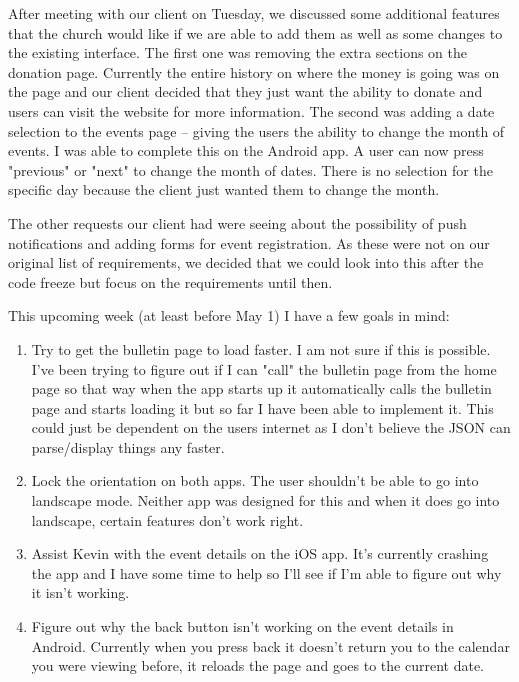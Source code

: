 After meeting with our client on Tuesday, we discussed some additional features that the church would like if we are able to add them as well as some changes to the existing interface. The first one was removing the extra sections on the donation page. Currently the entire history on where the money is going was on the page and our client decided that they just want the ability to donate and users can visit the website for more information. The second was adding a date selection to the events page -- giving the users the ability to change the month of events. I was able to complete this on the Android app. A user can now press "previous" or "next" to change the month of dates. There is no selection for the specific day because the client just wanted them to change the month.

The other requests our client had were seeing about the possibility of push notifications and adding forms for event registration. As these were not on our original list of requirements, we decided that we could look into this after the code freeze but focus on the requirements until then.

This upcoming week (at least before May 1) I have a few goals in mind:

	\begin{enumerate}
\item Try to get the bulletin page to load faster. I am not sure if this is possible. I've been trying to figure out if I can "call" the bulletin page from the home page so that way when the app starts up it automatically calls the bulletin page and starts loading it but so far I have been able to implement it. This could just be dependent on the users internet as I don't believe the JSON can parse/display things any faster.
\item Lock the orientation on both apps. The user shouldn't be able to go into landscape mode. Neither app was designed for this and when it does go into landscape, certain features don't work right.
\item Assist Kevin with the event details on the iOS app. It's currently crashing the app and I have some time to help so I'll see if I'm able to figure out why it isn't working.
\item Figure out why the back button isn't working on the event details in Android. Currently when you press back it doesn't return you to the calendar you were viewing before, it reloads the page and goes to the current date.
	\end{enumerate}


